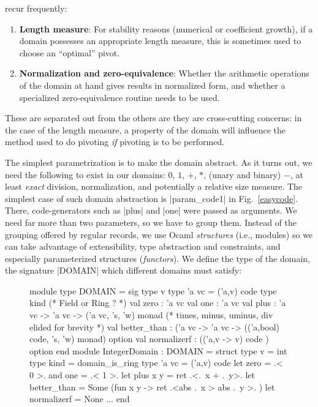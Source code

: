 \documentclass{llncs}
\begin{document}
recur frequently:
\vspace*{-6pt}
\begin{enumerate}
	\item \textbf{Length measure}:  For stability reasons
		(numerical or coefficient growth), if a domain
	  possesses
		an appropriate length measure, this is sometimes used to choose
		an ``optimal'' pivot.
	\item \textbf{Normalization and zero-equivalence}: Whether the 
		arithmetic operations of the domain at hand gives results in 
		normalized form, and whether a specialized zero-equivalence 
		routine needs to be used.
\end{enumerate}
\noindent These are separated out from the others are they are cross-cutting
concerns: in the case of the length measure, a property of the domain
will influence the method used to do pivoting \emph{if} pivoting is to be
performed.

The simplest parametrization is to make the domain abstract. As it
turns out, we need the following to exist in our domains: $0$, $1$,
$+$, $*$, (unary and binary) $-$, at least \emph{exact} division,
normalization, and potentially a relative size measure. The simplest
case of such domain abstraction is |param_code1| in
Fig.~\ref{easycode}. There, code-generators such as |plus| and |one|
were passed as arguments. We need far more than
two parameters, so we have to group them. Instead of the grouping
offered by regular records, we use Ocaml \emph{structures} (i.e.,
modules)
so we can take advantage of extensibility, type abstraction and constraints,
and especially parameterized structures (\emph{functors}).
We define the type of the domain, the signature |DOMAIN| which
different domains must satisfy:
\begin{figure}[h]
\begin{code}
module type DOMAIN = sig
  type v    type 'a vc = ('a,v) code
  type kind (* Field or Ring ? *)
  val zero : 'a vc   val one : 'a vc
  val plus : 'a vc -> 'a vc -> ('a vc, 's, 'w) monad
  (* times, minus, uminus, div elided for brevity *)
  val better_than : ('a vc -> 'a vc -> 
      (('a,bool) code, 's, 'w) monad) option
  val normalizerf : (('a,v -> v) code ) option
end 
module IntegerDomain : DOMAIN = struct
  type v = int  type kind = domain_is_ring
  type 'a vc = ('a,v) code
  let zero = .< 0 >.  and one = .< 1 >. 
  let plus x y = ret .<.~x + .~y>. 
  let better_than = Some (fun x y -> ret .<abs .~x > abs .~y >. )
  let normalizerf = None
  ...
end
\end{code}
\end{figure}
\end{document}
